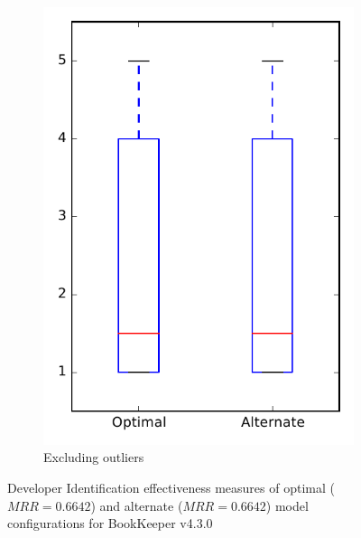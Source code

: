 \begin{figure}
\begin{subfigure}{.4\textwidth}
        \includegraphics[height=0.4\textheight]{figures/combo/dit_rq1_bookkeeper_no_outlier}
        \caption{Excluding outliers}\label{fig:combo:dit:rq1:bookkeeper_no_outlier}
    \end{subfigure}
\caption[Developer Identification effectiveness measures of optimal and alternate model configurations for BookKeeper v4.3.0]%
{Developer Identification effectiveness measures of optimal ($MRR=0.6642$) and alternate ($MRR=0.6642$) model configurations for BookKeeper v4.3.0}
\label{fig:combo:dit:rq1:bookkeeper}
\end{figure}

